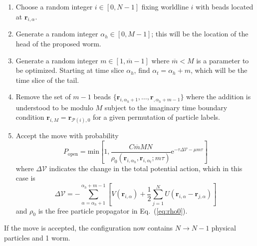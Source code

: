 \documentclass[prb,aps,amssym,nofootinbib,floatfix,notitlepage]{revtex4-1}
\renewcommand{\vec}[1]{\boldsymbol{#1}}
\newcommand{\e}[1]{\mathrm{e}^{#1}}
\renewcommand{\eqref}[1]{Eq.~(\ref{#1})}
\begin{document}
\begin{enumerate}
    \item Choose a random integer $i \in [0,N-1]$ fixing worldline $i$ with beads located
        at $\vec{r}_{i,\alpha}$.
    \item Generate a random integer $\alpha_h \in [0,M-1]$; this
        will be the location of the head of the proposed worm.
    \item Generate a random integer $m \in [1,\overline{m}-1]$ where $\overline{m} <
        M$ is a parameter to be optimized. Starting at time slice $\alpha_h$,
        find $\alpha_t = \alpha_h + m$, which will be the time slice of the tail.
    \item Remove the set of $m-1$ beads
        $\{\vec{r}_{i,\alpha_h+1},\ldots,
    \vec{r}_{,\alpha_h+m-1}\}$ where the addition is
    understood to be modulo $M$ subject to the imaginary time boundary
    condition $\vec{r}_{i,M} = \vec{r}_{\mathcal{P}(i),0}$ for a given
    permutation of particle labels.
\item Accept the move with probability
\begin{equation}
P_{\text{open}} = \mathrm{min}\left[1, 
    \frac{C \overline{m} M N}{\rho_0(\vec{r}_{i,\alpha_h},\vec{r}_{i,\alpha_t};m\tau)}
\e{-\tau \Delta \mathcal{V} - \mu m \tau} \right]
\end{equation}
%
where $\Delta \mathcal{V}$ indicates the change in the total potential action,
which in this case is
%
\begin{equation}
    \Delta\mathcal{V} = -\sum_{\alpha=\alpha_h+1}^{\alpha_h+m-1} \left[ 
        V(\vec{r}_{i,\alpha}) + \frac{1}{2}\sum_{j=1}^N
        U(\vec{r}_{i,\alpha}-\vec{r}_{j,\alpha}) \right]
\end{equation}
%
and $\rho_0$ is the free particle propagator in \eqref{eq:rho0}.
\end{enumerate}
If the move is accepted, the configuration now contains $N \to N-1$ physical
particles and 1 worm.\\[2ex]
%
\end{document}
